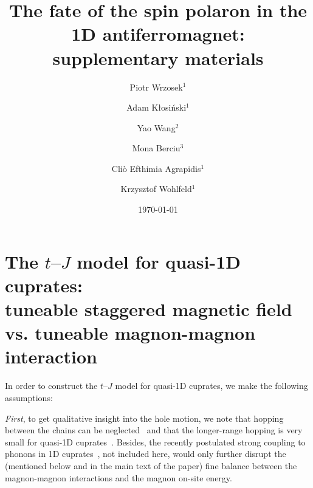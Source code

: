 \documentclass[%
 reprint,
 amsmath,amssymb,
 aps, onecolumn,
prl,
]{revtex4-1}
\begin{document}

\title{The fate of the spin polaron in the 1D antiferromagnet: \\ supplementary materials
}

\author{Piotr Wrzosek$^1$}
\author{Adam K\l{}osi\'nski$^1$}
\author{Yao Wang$^2$}
\author{Mona Berciu$^3$}
\author{Cli\`o Efthimia Agrapidis$^1$}
\author{Krzysztof Wohlfeld$^1$}
 
%

%

%

\date{\today}%
			 
\maketitle

\section{The $t$--$J$ model for quasi-1D cuprates:\\ tuneable staggered magnetic field vs. tuneable magnon-magnon interaction}

In order to construct the $t$--$J$ model for quasi-1D cuprates, we make the following assumptions:

{\it First}, to get qualitative insight into the hole motion, we note that hopping between the chains can 
be neglected~\cite{Gru18b} and that the longer-range hopping is
very small for quasi-1D cuprates~\cite{Li2021}. Besides, the recently postulated strong coupling to phonons in 1D cuprates~\cite{Chen2021}, not included here, would only further 
disrupt the (mentioned below and in the main text of the paper) fine balance between the magnon-magnon interactions and the magnon on-site energy.
\end{document}

